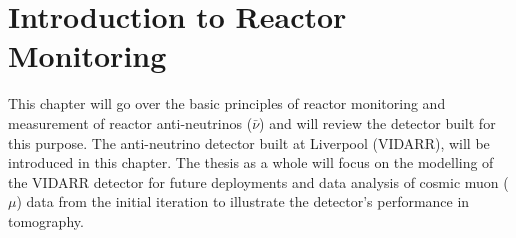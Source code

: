 
\ifpdf
    \graphicspath{{Chapter1/Figs/Raster/}{Chapter1/Figs/PDF/}{Chapter1/Figs/}}
\else
    \graphicspath{{Chapter1/Figs/Vector/}{Chapter1/Figs/}}
\fi

\chapter{Introduction to Reactor Monitoring} \label{Chap:theAimOfVidarr} %
This chapter will go over the basic principles of reactor monitoring and measurement of reactor anti-neutrinos ($\bar{\nu}$) and will review the detector built for this purpose. The anti-neutrino detector built at Liverpool (VIDARR), will be introduced in this chapter. The thesis as a whole will focus on the modelling of the VIDARR detector for future deployments and data analysis of cosmic muon ($\mu$) data from the initial iteration to illustrate the detector's performance in tomography.

